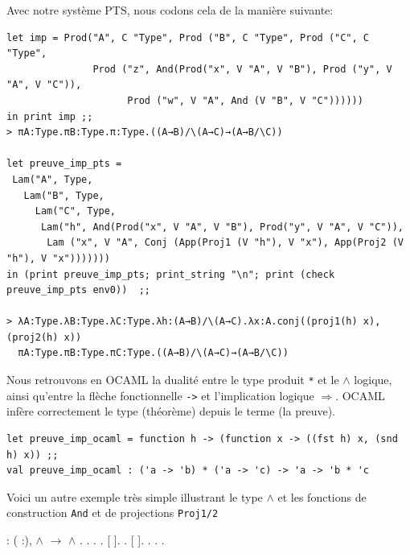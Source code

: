 \documentclass[11pt]{book}
\begin{document}
Avec notre système PTS, nous codons cela de la manière suivante:
\begin{Verbatim}
let imp = Prod("A", C "Type", Prod ("B", C "Type", Prod ("C", C "Type",
               Prod ("z", And(Prod("x", V "A", V "B"), Prod ("y", V "A", V "C")), 
                     Prod ("w", V "A", And (V "B", V "C"))))))
in print imp ;;
> πA:Type.πB:Type.π:Type.((A→B)/\(A→C)→(A→B/\C))

let preuve_imp_pts = 
 Lam("A", Type,
   Lam("B", Type,
     Lam("C", Type, 
      Lam("h", And(Prod("x", V "A", V "B"), Prod("y", V "A", V "C")), 
       Lam ("x", V "A", Conj (App(Proj1 (V "h"), V "x"), App(Proj2 (V "h"), V "x"))))))) 
in (print preuve_imp_pts; print_string "\n"; print (check preuve_imp_pts env0))  ;;

> λA:Type.λB:Type.λC:Type.λh:(A→B)/\(A→C).λx:A.conj((proj1(h) x),(proj2(h) x))
  πA:Type.πB:Type.πC:Type.((A→B)/\(A→C)→(A→B/\C))
\end{Verbatim}
Nous retrouvons en OCAML la dualité entre le type produit \verb+*+ et le $\wedge$ logique,
 ainsi qu'entre la flèche fonctionnelle \verb+->+ et l'implication logique $\Rightarrow$.
OCAML infère correctement le type (théorème) depuis le terme (la preuve).

\begin{Verbatim}
let preuve_imp_ocaml = function h -> (function x -> ((fst h) x, (snd h) x)) ;;
val preuve_imp_ocaml : ('a -> 'b) * ('a -> 'c) -> 'a -> 'b * 'c 
\end{Verbatim}

Voici un autre exemple très simple illustrant le type $\wedge$ et les fonctions de construction \verb+And+ et de projections \verb+Proj1/2+

\begin{coqdoccode}
\coqdocnoindent
{} : \coqdockw{\ensuremath{\forall}} ( :), \ensuremath{\land} \ensuremath{\rightarrow} \ensuremath{\land} .\coqdoceol
\coqdocnoindent
{}.\coqdoceol
\coqdocindent{0.50em}
   .\coqdoceol
\coqdocindent{0.50em}
.\coqdoceol
\coqdocindent{0.50em}
   [  ].\coqdoceol
\coqdocindent{0.50em}
.\coqdoceol
\coqdocindent{0.50em}
   [ ].\coqdoceol
\coqdocindent{0.50em}
.\coqdoceol
\coqdocnoindent
{}.\coqdoceol
\coqdocemptyline
\coqdocnoindent
{} .\coqdoceol
\coqdocemptyline
\end{coqdoccode}
\end{document}
